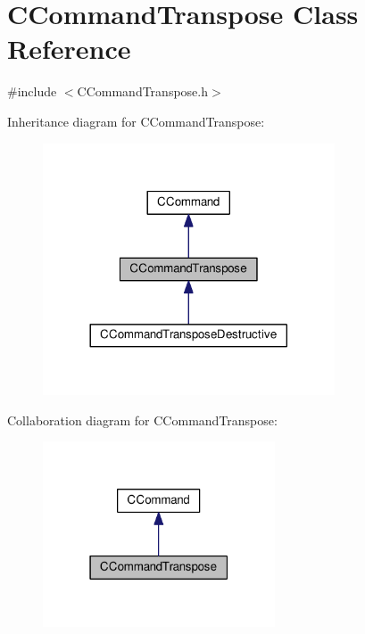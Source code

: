 \hypertarget{classCCommandTranspose}{}\section{C\+Command\+Transpose Class Reference}
\label{classCCommandTranspose}


{\ttfamily \#include $<$C\+Command\+Transpose.\+h$>$}



Inheritance diagram for C\+Command\+Transpose\+:
\nopagebreak
\begin{figure}[H]
\begin{center}
\leavevmode
\includegraphics[width=245pt]{classCCommandTranspose__inherit__graph}
\end{center}
\end{figure}


Collaboration diagram for C\+Command\+Transpose\+:\nopagebreak
\begin{figure}[H]
\begin{center}
\leavevmode
\includegraphics[width=195pt]{classCCommandTranspose__coll__graph}
\end{center}
\end{figure}
